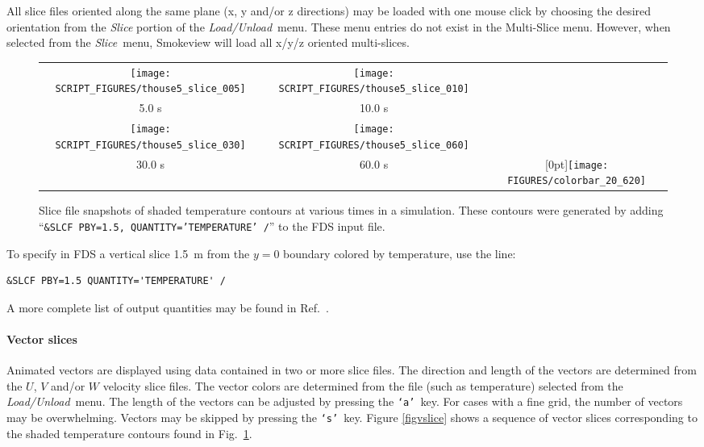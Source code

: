 \documentclass[11pt,twoside]{book}
\begin{document}
All slice files oriented along the same plane (x, y and/or z directions) may be loaded
with one mouse click by choosing the desired orientation from the {\em Slice}
portion of the {\em Load/Unload}\ menu.  These menu entries do not exist in the Multi-Slice menu.
However, when selected from the {\em Slice}\ menu, Smokeview will load all x/y/z oriented multi-slices.


\begin{figure}[\figoptions]
\begin{center}
\begin{tabular}{ccc}
\texttt{[image: SCRIPT\_FIGURES/thouse5\_slice\_005]}&
\texttt{[image: SCRIPT\_FIGURES/thouse5\_slice\_010]}\\
5.0 s&10.0 s\\
\texttt{[image: SCRIPT\_FIGURES/thouse5\_slice\_030]}&
\texttt{[image: SCRIPT\_FIGURES/thouse5\_slice\_060]}&\\
30.0 s&60.0 s
&\raisebox{0.0ex}[0pt]{\texttt{[image: FIGURES/colorbar\_20\_620]}}\\
\end{tabular}
\caption [Slice file snapshots of shaded temperature contours.]
{Slice file snapshots of shaded temperature contours at various
times in a simulation. These contours were generated by adding
``{\tt \&SLCF PBY=1.5, QUANTITY='TEMPERATURE' /}'' to the FDS
input file. }
\label{figslice}%
\end{center}
\end{figure}

\indent To specify in FDS a vertical slice 1.5~m from the $y=0$
boundary colored by temperature, use the line:
\begin{lstlisting}[basicstyle=\ttfamily]
&SLCF PBY=1.5 QUANTITY='TEMPERATURE' /
\end{lstlisting}
A more complete list of output quantities may be found in
Ref.~\cite{FDS_Users_Guide}.

\paragraph{Vector slices}Animated vectors are displayed using data contained in two or more
slice files.  The direction and length of the vectors are
determined from the $U$, $V$ and/or $W$ velocity slice files. The
vector colors are determined from the file (such as temperature)
selected from the {\em Load/Unload}\ menu. The length of the
vectors can be adjusted by pressing the {\tt `a'}\ key. For cases
with a fine grid, the number of vectors may be overwhelming.
Vectors may be skipped by pressing the {\tt `s'}\ key.  Figure
\ref{figvslice} shows a sequence of vector slices corresponding to
the shaded temperature contours found in Fig.~\ref{figslice}.
\end{document}
